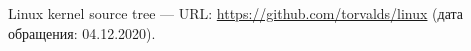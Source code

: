 
\begin{thebibliography}{3}
 Linux kernel source tree — URL: \url{https://github.com/torvalds/linux} (дата обращения: 04.12.2020).
\end{thebibliography}
